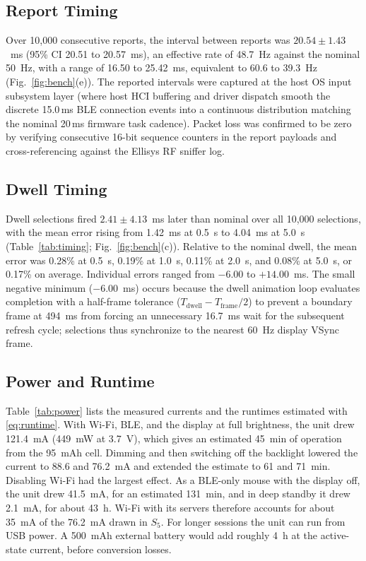 \documentclass[journal]{IEEEtran}
\begin{document}
\subsection{Report Timing}
Over 10,000 consecutive reports, the interval between reports was $20.54\pm1.43$~ms (95\% CI 20.51 to 20.57~ms), an effective rate of 48.7~Hz against the nominal 50~Hz, with a range of 16.50 to 25.42~ms, equivalent to 60.6 to 39.3~Hz (Fig.~\ref{fig:bench}(e)). The reported intervals were captured at the host OS input subsystem layer (where host HCI buffering and driver dispatch smooth the discrete 15.0\,ms BLE connection events into a continuous distribution matching the nominal 20\,ms firmware task cadence). Packet loss was confirmed to be zero by verifying consecutive 16-bit sequence counters in the report payloads and cross-referencing against the Ellisys RF sniffer log.

\subsection{Dwell Timing}
Dwell selections fired $2.41\pm4.13$~ms later than nominal over all 10,000 selections, with the mean error rising from 1.42~ms at 0.5~s to 4.04~ms at 5.0~s (Table~\ref{tab:timing}; Fig.~\ref{fig:bench}(c)). Relative to the nominal dwell, the mean error was 0.28\% at 0.5~s, 0.19\% at 1.0~s, 0.11\% at 2.0~s, and 0.08\% at 5.0~s, or 0.17\% on average. Individual errors ranged from $-6.00$ to $+14.00$~ms. The small negative minimum ($-6.00$~ms) occurs because the dwell animation loop evaluates completion with a half-frame tolerance ($T_{\mathrm{dwell}} - T_{\mathrm{frame}}/2$) to prevent a boundary frame at 494~ms from forcing an unnecessary 16.7~ms wait for the subsequent refresh cycle; selections thus synchronize to the nearest 60~Hz display VSync frame.

\subsection{Power and Runtime}
Table~\ref{tab:power} lists the measured currents and the runtimes estimated with \eqref{eq:runtime}. With Wi-Fi, BLE, and the display at full brightness, the unit drew 121.4~mA (449~mW at 3.7~V), which gives an estimated 45~min of operation from the 95~mAh cell. Dimming and then switching off the backlight lowered the current to 88.6 and 76.2~mA and extended the estimate to 61 and 71~min. Disabling Wi-Fi had the largest effect. As a BLE-only mouse with the display off, the unit drew 41.5~mA, for an estimated 131~min, and in deep standby it drew 2.1~mA, for about 43~h. Wi-Fi with its servers therefore accounts for about 35~mA of the 76.2~mA drawn in $S_5$. For longer sessions the unit can run from USB power. A 500~mAh external battery would add roughly 4~h at the active-state current, before conversion losses.
\end{document}
